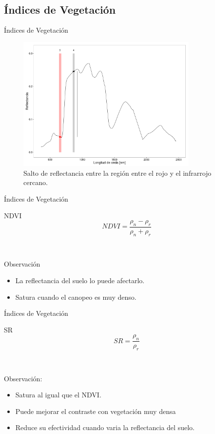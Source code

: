\documentclass[]{beamer}
\begin{document}
\subsection{Índices de Vegetación}

\begin{frame}{Índices de Vegetación}
    \begin{figure}
    \centering
    \includegraphics[width=0.8\textwidth]{imagenes/salto_nr.png}
    \caption{Salto de reflectancia entre la región entre el rojo y el infrarrojo cercano.}
    \end{figure}
\end{frame}
\begin{frame}{Índices de Vegetación}
  \begin{block}{NDVI}
      \begin{equation}
          NDVI = \frac{\rho_n-\rho_r}{\rho_n+\rho_r} 
      \end{equation}
  \end{block}\pause\
    \begin{block}{Observación}
        \begin{itemize}[<+->]
            \item La reflectancia del suelo lo puede afectarlo.
            \item Satura cuando el canopeo es muy denso.
        \end{itemize}
    \end{block}
\end{frame}

\begin{frame}{Índices de Vegetación}
  \begin{block}{SR}
     $$SR=\frac{\rho_n}{\rho_r}$$
  \end{block}\pause\
  \begin{block}{Observación:}
      \begin{itemize}[<+->]
        \item Satura al igual que el NDVI\@.
        \item Puede mejorar el contraste con vegetación muy densa
        \item Reduce su efectividad cuando varia la reflectancia del suelo.
    \end{itemize}
  \end{block}
\end{frame}
\end{document}
